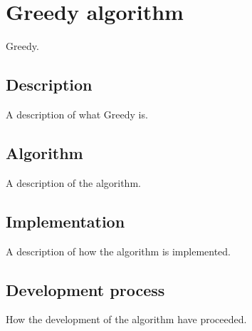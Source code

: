 \section{Greedy algorithm}
Greedy.
\subsection{Description}
A description of what Greedy is.
\subsection{Algorithm}
A description of the algorithm.
\subsection{Implementation}
A description of how the algorithm is implemented.
\subsection{Development process}
How the development of the algorithm have proceeded.